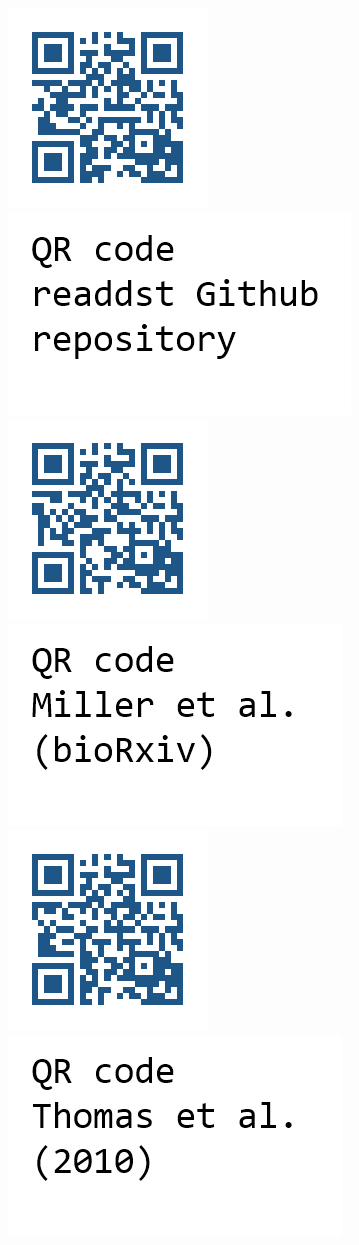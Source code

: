 \documentclass[14pt,a1paper,landscape]{tikzposter}
\begin{document}
\begin{columns}
{	\begin{tikzfigure}
		\includegraphics[width=.16\linewidth]{qrcode-readdst.png}
		\includegraphics[width=.16\linewidth]{QRcap-readdst.png}
		\includegraphics[width=.16\linewidth]{qrcode-bioRxiv.png}
		\includegraphics[width=.16\linewidth]{QRcap-bioRxiv.png}
		\includegraphics[width=.16\linewidth]{qrcode-thomas-1e5687.png}
		\includegraphics[width=.16\linewidth]{QRcap-thomasetal.png}	
	\end{tikzfigure}
}

\end{columns}
\end{document}
